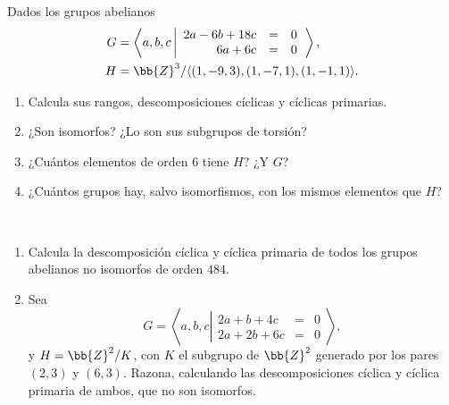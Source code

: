 \begin{ejercicio}\label{ej:7.11}
    Dados los grupos abelianos
    \begin{align*}
        G &= \left\langle a, b, c \left|
            \begin{array}{rcl}
                2a - 6b + 18c &=& 0 \\
                6a + 6c &=& 0
            \end{array}
        \right.\right\rangle,\\
        H &= \bb{Z}^3/\langle(1, -9, 3),(1, -7, 1),(1, -1, 1)\rangle.
    \end{align*}
    \begin{enumerate}
        \item Calcula sus rangos, descomposiciones cíclicas y cíclicas primarias.
        \item ¿Son isomorfos? ¿Lo son sus subgrupos de torsión?
        \item ¿Cuántos elementos de orden $6$ tiene $H$? ¿Y $G$?
        \item ¿Cuántos grupos hay, salvo isomorfismos, con los mismos elementos que $H$?
    \end{enumerate}
\end{ejercicio}

\begin{ejercicio}\label{ej:7.12}~
    \begin{enumerate}
        \item Calcula la descomposición cíclica y cíclica primaria de todos los grupos abelianos no isomorfos de orden $484$.
        \item Sea
        \begin{equation*}
            G = \left\langle a, b, c \left|
                \begin{array}{rcl}
                    2a + b + 4c &=& 0 \\
                    2a + 2b + 6c &=& 0
                \end{array}
            \right.\right\rangle,
        \end{equation*}
        y $H = \bb{Z}^2/K$, con $K$ el subgrupo de $\bb{Z}^2$ generado por los pares $(2, 3)$ y $(6, 3)$. Razona, calculando las descomposiciones cíclica y cíclica primaria de ambos, que no son isomorfos.
    \end{enumerate}
\end{ejercicio}

